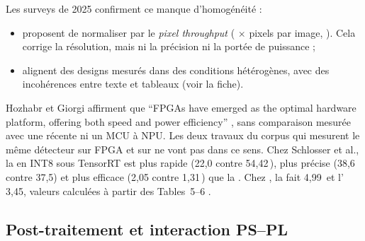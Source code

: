 Les surveys de 2025 confirment ce manque d'homogénéité :
\begin{itemize}
  \item \citet{2025-hozhabr-survey-real-time-object-detection} proposent de normaliser par
    le \emph{pixel throughput} ( $\times$ pixels par image, ). Cela corrige
    la résolution, mais ni la précision ni la portée de puissance ;
  \item \citet{arxiv-2509.04153-real-time-fpga-cnns-detection}\pp{} alignent des designs
    mesurés dans des conditions hétérogènes, avec des incohérences entre texte et tableaux
    (voir la fiche).
\end{itemize}
Hozhabr et Giorgi affirment que \enquote{FPGAs have emerged as the optimal hardware
platform, offering both speed and power efficiency} , sans comparaison mesurée
avec une  récente ni un MCU à NPU. Les deux travaux du corpus qui mesurent le même
détecteur sur FPGA et sur  ne vont pas dans ce sens. Chez Schlosser et al., la
 en INT8 sous TensorRT est plus rapide (22,0 contre 54,42\,), plus
précise (38,6 contre 37,5) et plus efficace (2,05 contre 1,31\,) que la 
. Chez , la  fait 4,99\, et l' 3,45, valeurs calculées
à partir des Tables~5--6 \deduit.

\subsection{Post-traitement et interaction PS--PL}

